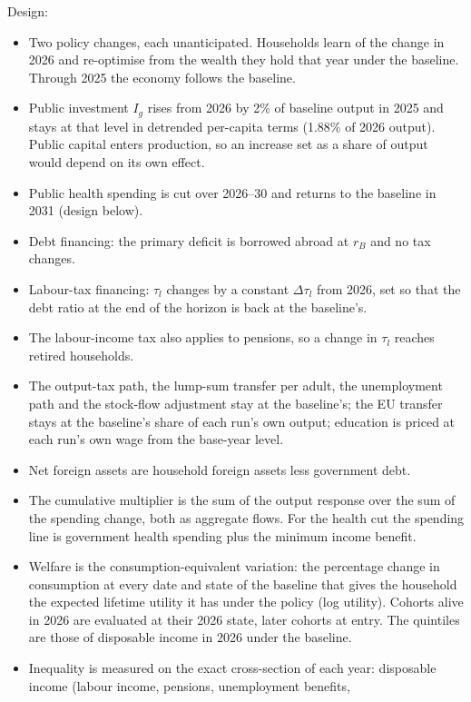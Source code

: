 \documentclass[11pt,a4paper]{article}
\begin{document}
\noindent\footnotesize
Design:
\begin{itemize}
\item Two policy changes, each unanticipated. Households learn of the change
  in 2026 and re-optimise from the wealth they hold that year under the
  baseline. Through 2025 the economy follows the baseline.
\item Public investment $I_g$ rises from 2026 by 2\% of baseline output in
  2025 and stays at that level in detrended per-capita terms (1.88\% of
  2026 output). Public capital enters production, so an increase set as a
  share of output would depend on its own effect.
\item Public health spending is cut over 2026--30 and returns to the
  baseline in 2031 (design below).
\item Debt financing: the primary deficit is borrowed abroad at $r_B$ and no
  tax changes.
\item Labour-tax financing: $\tau_l$ changes by a constant $\Delta\tau_l$
  from 2026, set so that the debt ratio at the end of the horizon is back at
  the baseline's.
\item The labour-income tax also applies to pensions, so a change in
  $\tau_l$ reaches retired households.
\item The output-tax path, the lump-sum transfer per adult, the unemployment
  path and the stock-flow adjustment stay at the baseline's; the EU transfer
  stays at the baseline's share of each run's own output; education is
  priced at each run's own wage from the base-year level.
\item Net foreign assets are household foreign assets less government debt.
\item The cumulative multiplier is the sum of the output response over the
  sum of the spending change, both as aggregate flows. For the health cut
  the spending line is government health spending plus the minimum income
  benefit.
\item Welfare is the consumption-equivalent variation: the percentage change
  in consumption at every date and state of the baseline that gives the
  household the expected lifetime utility it has under the policy (log
  utility). Cohorts alive in 2026 are evaluated at their 2026 state, later
  cohorts at entry. The quintiles are those of disposable income in 2026
  under the baseline.
\item Inequality is measured on the exact cross-section of each year:
  disposable income (labour income, pensions, unemployment benefits,

\end{itemize}
\end{document}
